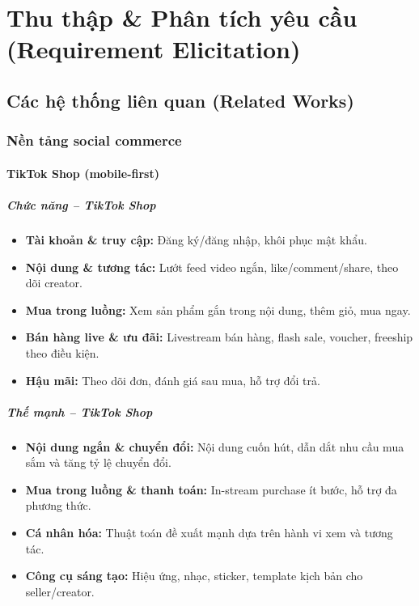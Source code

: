 \chapter{Thu thập \& Phân tích yêu cầu (Requirement Elicitation)}

\section{Các hệ thống liên quan (Related Works)}

\subsection{Nền tảng social commerce}

\subsubsection{TikTok Shop (mobile-first)}
\paragraph{Chức năng – TikTok Shop}
\begin{itemize}
    \item \textbf{Tài khoản \& truy cập:} Đăng ký/đăng nhập, khôi phục mật khẩu.
    \item \textbf{Nội dung \& tương tác:} Lướt feed video ngắn, like/comment/share, theo dõi creator.
    \item \textbf{Mua trong luồng:} Xem sản phẩm gắn trong nội dung, thêm giỏ, mua ngay.
    \item \textbf{Bán hàng live \& ưu đãi:} Livestream bán hàng, flash sale, voucher, freeship theo điều kiện.
    \item \textbf{Hậu mãi:} Theo dõi đơn, đánh giá sau mua, hỗ trợ đổi trả.
\end{itemize}

\paragraph{Thế mạnh – TikTok Shop}
\begin{itemize}
    \item \textbf{Nội dung ngắn \& chuyển đổi:} Nội dung cuốn hút, dẫn dắt nhu cầu mua sắm và tăng tỷ lệ chuyển đổi.
    \item \textbf{Mua trong luồng \& thanh toán:} In-stream purchase ít bước, hỗ trợ đa phương thức.
    \item \textbf{Cá nhân hóa:} Thuật toán đề xuất mạnh dựa trên hành vi xem và tương tác.
    \item \textbf{Công cụ sáng tạo:} Hiệu ứng, nhạc, sticker, template kịch bản cho seller/creator.
\end{itemize}

